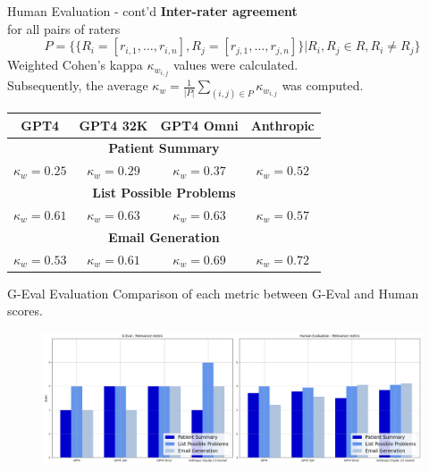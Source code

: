\documentclass[usenames,dvipsnames]{beamer}
\begin{document}
\begin{frame}{Human Evaluation - cont'd}
  \textbf{Inter-rater agreement}\\
  for all pairs of raters 
  \[
  P=\{\{R_i= [r_{i,1}, \ldots, r_{i,n}],R_j = [r_{j,1},\ldots,r_{j,n}]\}|R_i,R_j\in R, R_i\neq R_j\}
  \]
  Weighted Cohen’s kappa $\kappa_{w_{i,j}}$ values were calculated.\\
  Subsequently, the average $\kappa_w = \frac{1}{|P|}\sum_{(i,j)\in P} \kappa_{w_{i,j}}$ was computed.
  \vspace{5mm}
  {\tiny
  \begin{table}[b]
    \centering
    \setlength{\extrarowheight}{2pt}
    \begin{tabular}{|c|c|c|c|}
    \hline
    GPT4 & GPT4 32K & GPT4 Omni & Anthropic\\
    \hline
    \multicolumn{4}{|c|}{\textbf{Patient Summary}} \\
    \hline
    $\kappa_w=0.25$ & $\kappa_w=0.29$ & $\kappa_w=0.37$ & $\kappa_w=0.52$ \\
    \hline
    \multicolumn{4}{|c|}{\textbf{List Possible Problems}} \\
    \hline
    $\kappa_w=0.61$ & $\kappa_w=0.63$ & $\kappa_w=0.63$ & $\kappa_w=0.57$ \\
    \hline
    \multicolumn{4}{|c|}{\textbf{Email Generation}} \\
    \hline
    $\kappa_w=0.53$ & $\kappa_w=0.61$ & $\kappa_w=0.69$ & $\kappa_w=0.72$ \\
    \hline
    \end{tabular}
  \end{table}
  }
\end{frame}

\begin{frame}{G-Eval Evaluation}
  \centering
  Comparison of each metric between G-Eval and Human scores.
  \vspace{5mm}
  \begin{figure}[b]
    \includegraphics[width=\textwidth]{images/comparison.png}
  \end{figure}  
\end{frame}
\end{document}
